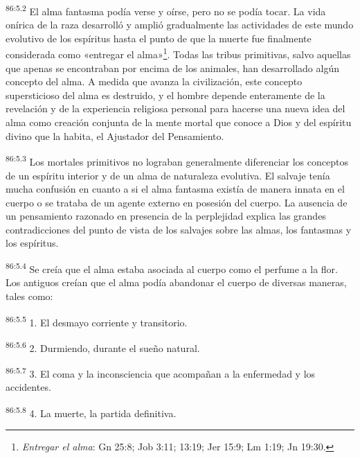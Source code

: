 \par
\textsuperscript{86:5.2} El alma fantasma podía verse y oírse, pero no se podía tocar. La vida onírica de la raza desarrolló y amplió gradualmente las actividades de este mundo evolutivo de los espíritus hasta el punto de que la muerte fue finalmente considerada como «entregar el alma»\footnote{\textit{Entregar el alma}: Gn 25:8; Job 3:11; 13:19; Jer 15:9; Lm 1:19; Jn 19:30.}. Todas las tribus primitivas, salvo aquellas que apenas se encontraban por encima de los animales, han desarrollado algún concepto del alma. A medida que avanza la civilización, este concepto supersticioso del alma es destruido, y el hombre depende enteramente de la revelación y de la experiencia religiosa personal para hacerse una nueva idea del alma como creación conjunta de la mente mortal que conoce a Dios y del espíritu divino que la habita, el Ajustador del Pensamiento.

\par
\textsuperscript{86:5.3} Los mortales primitivos no lograban generalmente diferenciar los conceptos de un espíritu interior y de un alma de naturaleza evolutiva. El salvaje tenía mucha confusión en cuanto a si el alma fantasma existía de manera innata en el cuerpo o se trataba de un agente externo en posesión del cuerpo. La ausencia de un pensamiento razonado en presencia de la perplejidad explica las grandes contradicciones del punto de vista de los salvajes sobre las almas, los fantasmas y los espíritus.

\par
\textsuperscript{86:5.4} Se creía que el alma estaba asociada al cuerpo como el perfume a la flor. Los antiguos creían que el alma podía abandonar el cuerpo de diversas maneras, tales como:

\par
\textsuperscript{86:5.5} 1. El desmayo corriente y transitorio.

\par
\textsuperscript{86:5.6} 2. Durmiendo, durante el sueño natural.

\par
\textsuperscript{86:5.7} 3. El coma y la inconsciencia que acompañan a la enfermedad y los accidentes.

\par
\textsuperscript{86:5.8} 4. La muerte, la partida definitiva.

